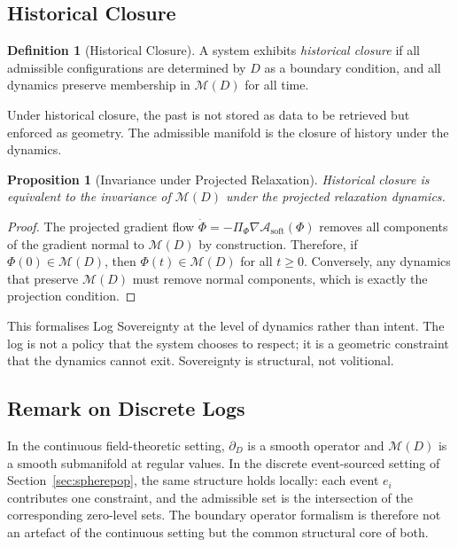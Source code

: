 \documentclass[12pt,oneside]{article}
\theoremstyle{plain}
\newtheorem{proposition}[theorem]{Proposition}
\theoremstyle{definition}
\newtheorem{definition}[theorem]{Definition}
\theoremstyle{remark}
\newcommand{\M}{\mathcal{M}}
\newcommand{\D}{D}
\newcommand{\Asoft}{\mathcal{A}_{\mathrm{soft}}}
\begin{document}
\subsection{Historical Closure}

\begin{definition}[Historical Closure]
A system exhibits \emph{historical closure} if all admissible configurations
are determined by $\D$ as a boundary condition, and all dynamics preserve
membership in $\M(\D)$ for all time.
\end{definition}

Under historical closure, the past is not stored as data to be retrieved but
enforced as geometry. The admissible manifold is the closure of history under
the dynamics.

\begin{proposition}[Invariance under Projected Relaxation]
\label{prop:invariance}
Historical closure is equivalent to the invariance of $\M(\D)$ under the
projected relaxation dynamics.
\end{proposition}

\begin{proof}
The projected gradient flow $\dot\Phi = -\Pi_\Phi\nabla\Asoft(\Phi)$ removes
all components of the gradient normal to $\M(\D)$ by construction. Therefore,
if $\Phi(0) \in \M(\D)$, then $\Phi(t) \in \M(\D)$ for all $t \geq 0$.
Conversely, any dynamics that preserve $\M(\D)$ must remove normal components,
which is exactly the projection condition.
\end{proof}

This formalises Log Sovereignty at the level of dynamics rather than intent.
The log is not a policy that the system chooses to respect; it is a geometric
constraint that the dynamics cannot exit. Sovereignty is structural, not
volitional.

\subsection{Remark on Discrete Logs}

In the continuous field-theoretic setting, $\partial_\D$ is a smooth operator
and $\M(\D)$ is a smooth submanifold at regular values. In the discrete
event-sourced setting of Section~\ref{sec:spherepop}, the same structure holds
locally: each event $e_i$ contributes one constraint, and the admissible set is
the intersection of the corresponding zero-level sets. The boundary operator
formalism is therefore not an artefact of the continuous setting but the common
structural core of both.
\end{document}
